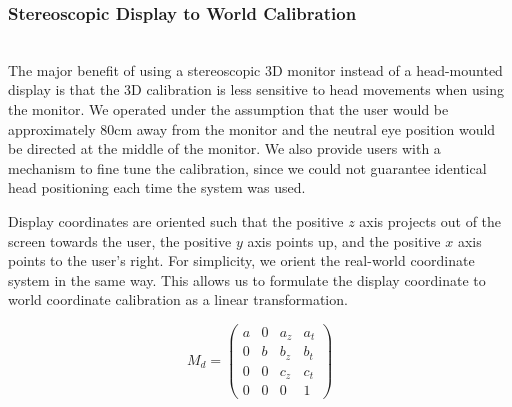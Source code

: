 \documentclass[pageno]{jpaper}
\begin{document}
\subsubsection{Stereoscopic Display to World Calibration}$ $\\
The major benefit of using a stereoscopic 3D monitor instead of a head-mounted display is that the 3D calibration is less sensitive to
head movements when using the monitor. We operated under the assumption that the user would be approximately 80cm away from the monitor
and the neutral eye position would be directed at the middle of the monitor. We also provide users with a mechanism to fine tune the
calibration, since we could not guarantee identical head positioning each time the system was used.

Display coordinates are oriented such that the positive $z$ axis projects out of the screen towards the user, the positive $y$ axis points up, and the positive $x$ axis points to the user's right.
For simplicity, we orient the real-world coordinate system in the same way. This allows us to formulate the display coordinate to world coordinate calibration as a linear transformation.

$$M_{d} = \left(
\begin{array}{cccc}
a & 0 & a_z & a_t \\
0 & b & b_z & b_t \\
0 & 0 & c_z & c_t \\
0 & 0 &   0 &   1
\end{array}\right)$$
\end{document}
